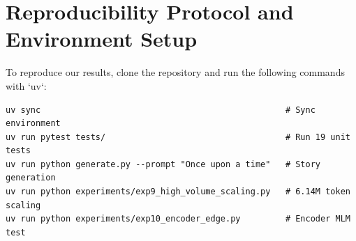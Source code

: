 \section{Reproducibility Protocol and Environment Setup}
To reproduce our results, clone the repository and run the following commands with `uv`:
\begin{verbatim}
uv sync                                                 # Sync environment
uv run pytest tests/                                    # Run 19 unit tests
uv run python generate.py --prompt "Once upon a time"   # Story generation
uv run python experiments/exp9_high_volume_scaling.py   # 6.14M token scaling
uv run python experiments/exp10_encoder_edge.py         # Encoder MLM test
\end{verbatim}
